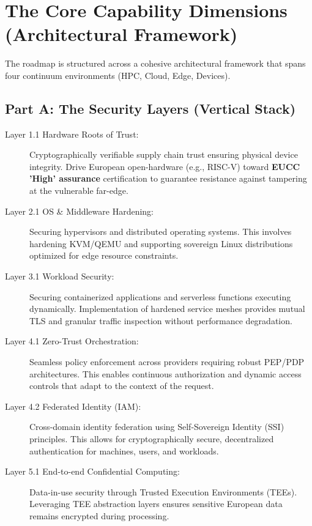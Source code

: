 \documentclass[12pt,a4paper]{article}
\begin{document}
\section{The Core Capability Dimensions (Architectural Framework)}
The roadmap is structured across a cohesive architectural framework that spans four continuum environments (HPC, Cloud, Edge, Devices).

\subsection*{Part A: The Security Layers (Vertical Stack)}
\begin{description}
\item[Layer 1.1 Hardware Roots of Trust:] Cryptographically verifiable supply chain trust ensuring physical device integrity. Drive European open-hardware (e.g., RISC-V) toward \textbf{EUCC 'High' assurance} certification \cite{eucc} to guarantee resistance against tampering at the vulnerable far-edge.

\item[Layer 2.1 OS \& Middleware Hardening:] Securing hypervisors and distributed operating systems. This involves hardening KVM/QEMU and supporting sovereign Linux distributions optimized for edge resource constraints.

\item[Layer 3.1 Workload Security:] Securing containerized applications and serverless functions executing dynamically. Implementation of hardened service meshes provides mutual TLS and granular traffic inspection without performance degradation.

\item[Layer 4.1 Zero-Trust Orchestration:] Seamless policy enforcement across providers requiring robust PEP/PDP architectures. This enables continuous authorization and dynamic access controls that adapt to the context of the request.

\item[Layer 4.2 Federated Identity (IAM):] Cross-domain identity federation using Self-Sovereign Identity (SSI) principles. This allows for cryptographically secure, decentralized authentication for machines, users, and workloads.

\item[Layer 5.1 End-to-end Confidential Computing:] Data-in-use security through Trusted Execution Environments (TEEs). Leveraging TEE abstraction layers ensures sensitive European data remains encrypted during processing.


\end{description}
\end{document}
